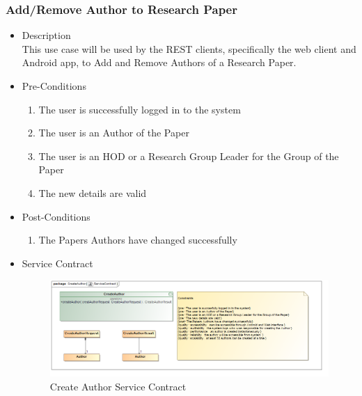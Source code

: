 \documentclass[a4paper,10pt]{article}
\begin{document}
\subsubsection{Add/Remove Author to Research Paper}
	\begin{itemize}
		\item Description\\
			This use case will be used by the REST clients, specifically the web client and Android app, to Add and Remove Authors of a Research Paper.
		\item Pre-Conditions
			\begin{enumerate}
				\item The user is successfully logged in to the system
				\item The user is an Author of the Paper
				\item The user is an HOD or a Research Group Leader for the Group of the Paper
				\item The new details are valid
			\end{enumerate}
		\item Post-Conditions
			\begin{enumerate}
				\item The Papers Authors have changed successfully
						
			\end{enumerate}
		\item Service Contract
			\begin{figure}[H]
				\includegraphics[scale=0.5]{CreateAuthorServiceContract}
				\caption{Create Author Service Contract}
			\end{figure}



	\end{itemize}
\end{document}
